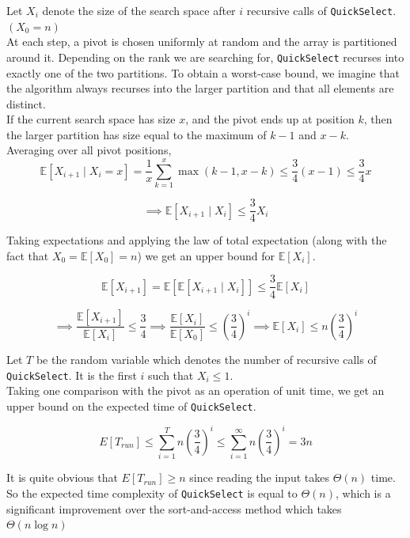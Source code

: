 Let \(X_i\) denote the size of the search space after \(i\) recursive calls of 
\texttt{QuickSelect}. $(X_0=n)$\\

\noindent At each step, a pivot is chosen uniformly at random and the array is partitioned around it.
Depending on the rank we are searching for, \texttt{QuickSelect} recurses into exactly one of the two partitions. 
To obtain a worst-case bound, we imagine that the algorithm always recurses into the larger partition and that 
all elements are distinct.\\


\noindent If the current search space has size \(x\), and the pivot ends up at position \(k\), 
then the larger partition has size equal to the maximum of $k-1$ and \(x-k\).\\

\noindent Averaging over all pivot positions,
\[
\mathbb E[X_{i+1}\mid X_i=x]
=
\frac1x
\sum_{k=1}^{x}
\max(k-1,x-k)
\le
\frac34(x-1)
\le
\frac34x
\]

\[
\implies
\mathbb E[X_{i+1}\mid X_i]
\le
\frac34 X_i
\]

Taking expectations and applying the law of total expectation 
(along with the fact that $X_0=\mathbb E[X_0]=n$) we get an upper bound for $\mathbb E[X_{i}]$.

\[
\mathbb E[X_{i+1}]
=
\mathbb E\!\left[\mathbb E[X_{i+1}\mid X_i]\right]
\le
\frac34\mathbb E[X_i]
\]

\[
\implies \frac{\mathbb E[X_{i+1}]}{\mathbb E[X_i]} \le \frac34
\implies
\frac{\mathbb E[X_i]}{\mathbb E[X_0]}
\le
\left(\frac34\right)^i
\implies \mathbb E[X_i] \le n \left(\frac{3}{4}\right)^i 
\]


\noindent Let $T$ be the random variable which denotes the number of recursive calls of \texttt{QuickSelect}. 
It is the first $i$ such that $X_i \le 1$. \\


\noindent Taking one comparison with the pivot as an operation of unit time, we get an upper bound on the 
expected time of \texttt{QuickSelect}.

\[
E[T_{run}] \le \sum_{i=1}^T n \left(\frac{3}{4}\right)^i \le \sum_{i=1}^{\infty} n\left(\frac{3}{4}\right)^i = 3n
\]

\noindent It is quite obvious that $E[T_{run}] \ge n$ since reading the input takes $\Theta(n)$ time. 
So the expected time complexity of \texttt{QuickSelect} is equal to \(\Theta(n)\), which is a 
significant improvement over the sort-and-access method which takes \(\Theta(n\log n)\)

